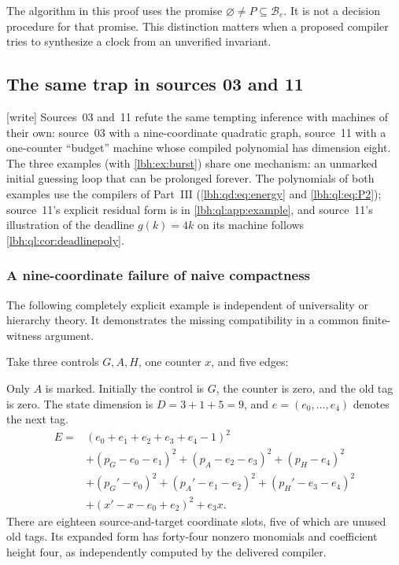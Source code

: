 \documentclass[11pt,letterpaper]{article}
\theoremstyle{definition}
\theoremstyle{remark}
\newcommand{\cB}{\mathcal B}
\newcommand{\1}{\mathbf 1}
\newcommand{\wtag}{\textup{[write]}}%
\newcommand{\srctag}[1]{\texorpdfstring{\hspace{0.4em}{\normalfont\small\color{accent}[source #1]}}{ [source #1]}}
\begin{document}
The algorithm in this proof uses the promise $\varnothing\ne P\subseteq\cB_e$.
It is not a decision procedure for that promise. This distinction matters
when a proposed compiler tries to synthesize a clock from an unverified
invariant.
\subsection{The same trap in sources 03 and 11}\label{lbh:sec:traps}
\wtag{} Sources~03 and~11 refute the same tempting inference with machines of their own:
source~03 with a nine-coordinate quadratic graph, source~11 with a one-counter ``budget''
machine whose compiled polynomial has dimension eight. The three examples (with
\cref{lbh:ex:burst}) share one mechanism: an unmarked initial guessing loop that can be
prolonged forever. The polynomials of both examples use the compilers of Part~III
(\cref{lbh:qd:eq:energy} and \cref{lbh:ql:eq:P2}); source~11's explicit residual form is in
\cref{lbh:ql:app:example}, and source~11's illustration of the deadline $g(k)=4k$ on its machine
follows \cref{lbh:ql:cor:deadlinepoly}.
\subsubsection{A nine-coordinate failure of naive compactness\srctag{03}}\label{lbh:qd:sec:counterexample}

The following completely explicit example is independent of universality
or hierarchy theory. It demonstrates the missing compatibility in a common
finite-witness argument.

Take three controls $G,A,H$, one counter $x$, and five edges:
\begin{center}
\end{center}
Only $A$ is marked. Initially the control is $G$, the counter is zero,
and the old tag is zero. The state dimension is $D=3+1+5=9$, and
$e=(e_0,\ldots,e_4)$ denotes the next tag.
\begin{align}
 E={}&(e_0+e_1+e_2+e_3+e_4-1)^2\nonumber\\
 &+(p_G-e_0-e_1)^2+(p_A-e_2-e_3)^2+(p_H-e_4)^2\nonumber\\
 &+(p_G'-e_0)^2+(p_A'-e_1-e_2)^2+(p_H'-e_3-e_4)^2\label{lbh:qd:eq:small}\\
 &+(x'-x-e_0+e_2)^2+e_3x.\nonumber
\end{align}
There are eighteen source-and-target coordinate slots, five of which are
unused old tags. Its expanded form has forty-four nonzero monomials and
coefficient height four, as independently computed by the delivered compiler.
\end{document}

